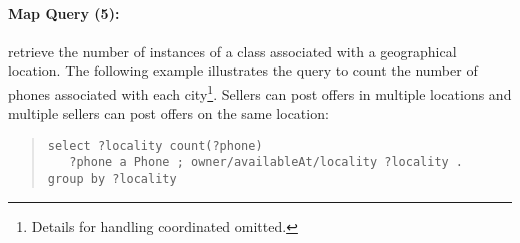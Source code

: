 \paragraph{Map Query (5):} retrieve the number of instances of a class associated with a geographical location.
The following example illustrates the query to count the number of phones associated with each city\footnote{Details for handling coordinated omitted.}. 
Sellers can post offers in multiple locations and multiple sellers can post offers on the same location:
{\footnotesize
\begin{quote}
\begin{verbatim}
select ?locality count(?phone)
   ?phone a Phone ; owner/availableAt/locality ?locality .
group by ?locality
\end{verbatim}
\end{quote}}